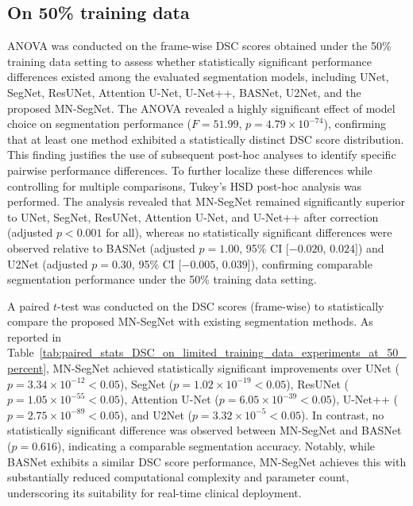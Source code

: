 \documentclass[12pt,letterpaper]{article}
\begin{document}
\subsection{On 50\% training data}
ANOVA was conducted on the frame-wise DSC scores obtained under the 50\% training data setting to assess whether statistically significant performance differences existed among the evaluated segmentation models, including UNet, SegNet, ResUNet, Attention U-Net, U-Net++, BASNet, U2Net, and the proposed MN-SegNet. The ANOVA revealed a highly significant effect of model choice on segmentation performance ($F = 51.99$, $p = 4.79 \times 10^{-74}$), confirming that at least one method exhibited a statistically distinct DSC score distribution. This finding justifies the use of subsequent post-hoc analyses to identify specific pairwise performance differences. To further localize these differences while controlling for multiple comparisons, Tukey’s HSD post-hoc analysis was performed. The analysis revealed that MN-SegNet remained significantly superior to UNet, SegNet, ResUNet, Attention U-Net, and U-Net++ after correction (adjusted $p < 0.001$ for all), whereas no statistically significant differences were observed relative to BASNet (adjusted $p = 1.00$, 95\% CI [$-0.020$, $0.024$]) and U2Net (adjusted $p = 0.30$, 95\% CI [$-0.005$, $0.039$]), confirming comparable segmentation performance under the 50\% training data setting.


A paired $t$-test was conducted on the DSC scores (frame-wise) to statistically compare the proposed MN-SegNet with existing segmentation methods. As reported in Table~\ref{tab:paired_stats_DSC_on_limited_training_data_experiments_at_50_percent}, MN-SegNet achieved statistically significant improvements over UNet ($p = 3.34 \times 10^{-12}< 0.05$), SegNet ($p = 1.02 \times 10^{-19}< 0.05$), ResUNet ($p = 1.05 \times 10^{-55}< 0.05$), Attention U-Net ($p = 6.05 \times 10^{-39}< 0.05$), U-Net++ ($p = 2.75 \times 10^{-89}< 0.05$), and U2Net ($p = 3.32 \times 10^{-5}< 0.05$). In contrast, no statistically significant difference was observed between MN-SegNet and BASNet ($p = 0.616$), indicating a comparable segmentation accuracy. Notably, while BASNet exhibits a similar DSC score performance, MN-SegNet achieves this with substantially reduced computational complexity and parameter count, underscoring its suitability for real-time clinical deployment.
\end{document}

